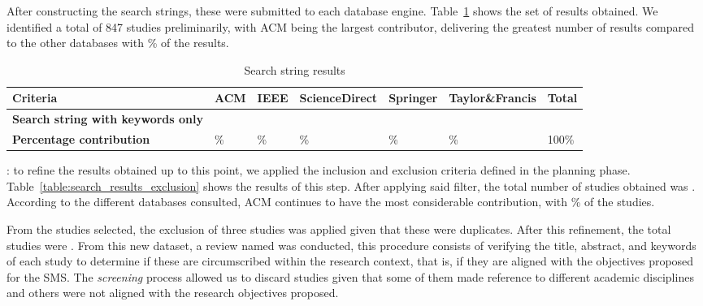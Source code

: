 After constructing the search strings, these were submitted to each database engine. Table~\ref{table:search_results} shows the set of results obtained. We identified a total of 847 studies preliminarily, with ACM being the largest contributor, delivering the greatest number of results compared to the other databases with \acmp\% of the results.


\begin{table}[htbp]
	\centering
	\caption{Search string results}
	\label{table:search_results}
	\renewcommand{\arraystretch}{1}  %
	\begin{tabular}{p{4.8cm}p{1.7cm}p{1.7cm}p{1.7cm}p{1.7cm}p{2cm}p{1.4cm}}
		\toprule
		\textbf{Criteria}                                        & \textbf{ACM} & \textbf{IEEE} & \textbf{ScienceDirect} & \textbf{Springer} & \textbf{Taylor\&Francis} & \textbf{Total} \\
		\midrule
		\textbf{Search string with keywords only} & \acm{}       & \ieee{}       & \sd{}                  & \spr{}            & \tf{}                    & \tot{}         \\
		\addlinespace[0.8em]
		\textbf{Percentage contribution}                          & \acmp{}\%    & \ieeep{}\%    & \sdp{}\%               & \sprp{}\%         & \tfp{}\%                 & 100\%          \\
		\bottomrule
	\end{tabular}
\end{table}




: to refine the results obtained up to this point, we applied the inclusion and exclusion criteria defined in the planning phase. Table~\ref{table:search_results_exclusion} shows the results of this step. After applying said filter, the total number of studies obtained was \itot. According to the different databases consulted, ACM continues to have the most considerable contribution, with \iacmp\% of the studies.


From the \itot{} studies selected, the exclusion of three studies was applied given that these were duplicates. After this refinement, the total studies were \depTot{}. From this new dataset, a review named  was conducted, this procedure consists of verifying the title, abstract, and keywords of each study to determine if these are circumscribed within the research context, that is, if they are aligned with the objectives proposed for the SMS. The \textit{screening} process allowed us to discard \screen{} studies given that some of them made reference to different academic disciplines and others were not aligned with the research objectives proposed.

